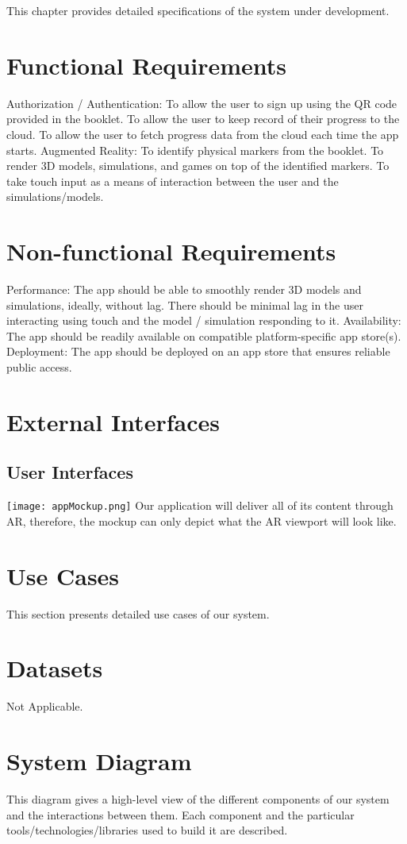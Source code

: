 This chapter provides detailed specifications of the system under development.

\section{Functional Requirements}
\begin{outline}
  \1 Authorization / Authentication:
  \2 To allow the user to sign up using the QR code provided in the booklet.
  \2 To allow the user to keep record of their progress to the cloud.
  \2 To allow the user to fetch progress data from the cloud each time the app starts.
  \1 Augmented Reality:
  \2 To identify physical markers from the booklet.
  \2 To render 3D models, simulations, and games on top of the identified markers.
  \2 To take touch input as a means of interaction between the user and the simulations/models.
\end{outline}


\section{Non-functional Requirements}
\begin{outline}
  \1 Performance:
  \2 The app should be able to smoothly render 3D models and simulations, ideally, without lag.
  \2 There should be minimal lag in the user interacting using touch and the model / simulation responding to it.
  \1 Availability:
  \2 The app should be readily available on compatible platform-specific app store(s).
  \1 Deployment:
  \2 The app should be deployed on an app store that ensures reliable public access.
\end{outline}

\section{External Interfaces}
\subsection{User Interfaces}
\texttt{[image: appMockup.png]}
\newline
Our application will deliver all of its content through AR, therefore, the mockup can only depict what the AR viewport will look like.

\section{Use Cases}
This section presents detailed use cases of our system.

\section{Datasets}
Not Applicable.

\section{System Diagram}
This diagram gives a high-level view of the different components of our system and the interactions between them. Each component and the particular tools/technologies/libraries used to build it are described.